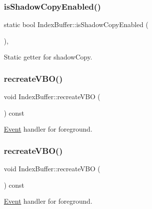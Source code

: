 \subsubsection{\texorpdfstring{is\+Shadow\+Copy\+Enabled()}{isShadowCopyEnabled()}\hspace{0.1cm}{\footnotesize\ttfamily [2/2]}}
{\footnotesize\ttfamily static bool Index\+Buffer\+::is\+Shadow\+Copy\+Enabled (\begin{DoxyParamCaption}{ }\end{DoxyParamCaption})\hspace{0.3cm}{\ttfamily [inline]}, {\ttfamily [static]}}

Static getter for shadow\+Copy. \mbox{\label{classIndexBuffer_a2a95f7b337532842aa59468417006a6d}} 
\subsubsection{\texorpdfstring{recreate\+V\+B\+O()}{recreateVBO()}\hspace{0.1cm}{\footnotesize\ttfamily [1/2]}}
{\footnotesize\ttfamily void Index\+Buffer\+::recreate\+V\+BO (\begin{DoxyParamCaption}{ }\end{DoxyParamCaption}) const\hspace{0.3cm}{\ttfamily [protected]}}

\hyperlink{classEvent}{Event} handler for foreground. \mbox{\label{classIndexBuffer_a2a95f7b337532842aa59468417006a6d}} 
\subsubsection{\texorpdfstring{recreate\+V\+B\+O()}{recreateVBO()}\hspace{0.1cm}{\footnotesize\ttfamily [2/2]}}
{\footnotesize\ttfamily void Index\+Buffer\+::recreate\+V\+BO (\begin{DoxyParamCaption}{ }\end{DoxyParamCaption}) const\hspace{0.3cm}{\ttfamily [protected]}}

\hyperlink{classEvent}{Event} handler for foreground. \mbox{\label{classIndexBuffer_aa73c6fe1387b942e6d570d443e6e37c1}} 
